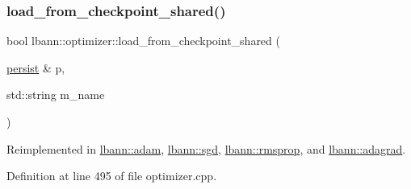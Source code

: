 \mbox{\label{classlbann_1_1optimizer_a42a52aab9a682fda57c1e639968a44b9}} 
\subsubsection{\texorpdfstring{load\+\_\+from\+\_\+checkpoint\+\_\+shared()}{load\_from\_checkpoint\_shared()}}
{\footnotesize\ttfamily bool lbann\+::optimizer\+::load\+\_\+from\+\_\+checkpoint\+\_\+shared (\begin{DoxyParamCaption}\item[{\hyperlink{classlbann_1_1persist}{persist} \&}]{p,  }\item[{std\+::string}]{m\+\_\+name }\end{DoxyParamCaption})\hspace{0.3cm}{\ttfamily [virtual]}}



Reimplemented in \hyperlink{classlbann_1_1adam_aca07e925a4751fc5c10a62fb9c72c896}{lbann\+::adam}, \hyperlink{classlbann_1_1sgd_aa3e3237a59b0593d7caf7357b7c181cf}{lbann\+::sgd}, \hyperlink{classlbann_1_1rmsprop_a64db08f787ca8904a0ba4ecc37d5d1ed}{lbann\+::rmsprop}, and \hyperlink{classlbann_1_1adagrad_ac6b6eb0c4d393679f69281c072dbc4fa}{lbann\+::adagrad}.



Definition at line 495 of file optimizer.\+cpp.


